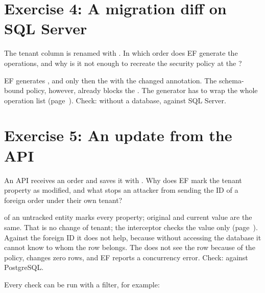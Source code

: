 \section{Exercise 4: A migration diff on SQL Server}

The tenant column is renamed with
.
In which order does EF generate the operations, and why is it not enough to recreate the security
policy at the ?

\begin{note}[Solution]
  EF generates ,  and only then the
   with the changed annotation. The
  schema-bound policy, however, already blocks the . The generator
  has to wrap the whole operation list
  (page~\pageref{sec:sqlserver-schema-bound-changes}).
  Check: 
  without a database, 
  against SQL Server.
\end{note}

\section{Exercise 5: An update from the API}

An API receives an order and saves it with . Why does EF mark the tenant property as
modified, and what stops an attacker from sending the ID of a foreign order under their own tenant?

\begin{note}[Solution]
   of an untracked entity marks every property; original and current value are the
  same. That is no change of tenant; the interceptor checks the value only
  (page~\pageref{sec:tracking-flag-versus-value}). Against the foreign ID it does not help,
  because without accessing the database it cannot know to whom the row belongs. The
   does not see the row because of the policy, changes zero rows, and EF reports a
  concurrency error. Check:  against
  PostgreSQL.
\end{note}

Every check can be run with a filter, for example:

